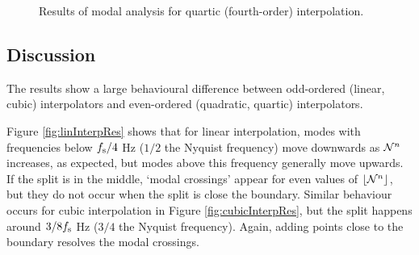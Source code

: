 \begin{figure}[h]
    \centering
    \hfill
    \caption{Results of modal analysis for quartic (fourth-order) interpolation.}\label{fig:quarticInterpRes}
\end{figure}

\subsection{Discussion}
The results show a large behavioural difference between odd-ordered (linear, cubic) interpolators and even-ordered (quadratic, quartic) interpolators.  

Figure \ref{fig:linInterpRes} shows that for linear interpolation, modes with frequencies below $f_\text{s}/4$ Hz ($1/2$ the Nyquist frequency) move downwards as $\mathcal{N}^n$ increases, as expected, but modes above this frequency generally move upwards. If the split is in the middle, `modal crossings' appear for even values of $\floor[\Nfrac^n]$, but they do not occur when the split is close the boundary. Similar behaviour occurs for cubic interpolation in Figure \ref{fig:cubicInterpRes}, but the split happens around $3/8 f_\text{s}$ Hz ($3/4$ the Nyquist frequency). Again, adding points close to the boundary resolves the modal crossings. 

